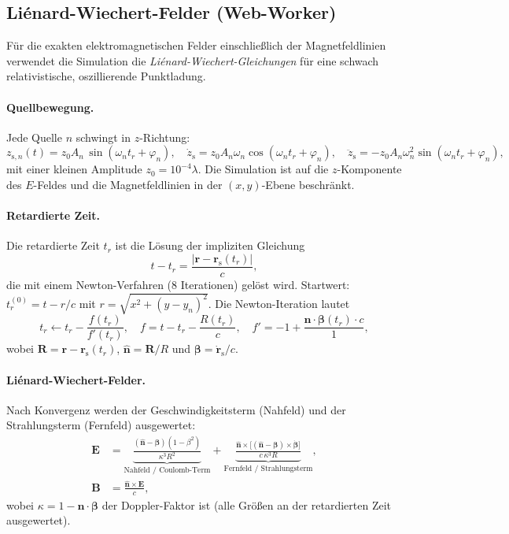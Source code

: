 \documentclass[11pt,a4paper]{article}
\begin{document}
\subsection{Liénard-Wiechert-Felder (Web-Worker)}

Für die exakten elektromagnetischen Felder einschließlich der Magnetfeldlinien
verwendet die Simulation die \emph{Liénard-Wiechert-Gleichungen} für eine
schwach relativistische, oszillierende Punktladung.

\paragraph{Quellbewegung.}
Jede Quelle $n$ schwingt in $z$-Richtung:
\[
  z_{\text{s},n}(t) = z_0 A_n\,\sin(\omega_n t_r + \varphi_n), \quad
  \dot z_{\text{s}} = z_0 A_n \omega_n \cos(\omega_n t_r + \varphi_n), \quad
  \ddot z_{\text{s}} = -z_0 A_n \omega_n^2 \sin(\omega_n t_r + \varphi_n),
\]
mit einer kleinen Amplitude $z_0 = 10^{-4}\lambda$.  Die Simulation ist auf die
$z$-Komponente des $E$-Feldes und die Magnetfeldlinien in der $(x,y)$-Ebene
beschränkt.

\paragraph{Retardierte Zeit.}
Die retardierte Zeit $t_r$ ist die Lösung der impliziten Gleichung
\[
  t - t_r = \frac{|\mathbf{r} - \mathbf{r}_{\text{s}}(t_r)|}{c},
\]
die mit einem Newton-Verfahren (8 Iterationen) gelöst wird.
Startwert: $t_r^{(0)} = t - r/c$ mit $r = \sqrt{x^2 + (y-y_n)^2}$.
Die Newton-Iteration lautet
\[
  t_r \leftarrow t_r - \frac{f(t_r)}{f'(t_r)}, \quad
  f = t - t_r - \frac{R(t_r)}{c}, \quad
  f' = -1 + \frac{\hat{\mathbf{n}}\cdot\boldsymbol{\beta}(t_r) \cdot c}{1},
\]
wobei $\mathbf{R} = \mathbf{r} - \mathbf{r}_{\text{s}}(t_r)$,
$\hat{\mathbf{n}} = \mathbf{R}/R$ und
$\boldsymbol{\beta} = \dot{\mathbf{r}}_{\text{s}}/c$.

\paragraph{Liénard-Wiechert-Felder.}
Nach Konvergenz werden der Geschwindigkeitsterm (Nahfeld) und der
Strahlungsterm (Fernfeld) ausgewertet:
\begin{align}
  \mathbf{E} &= \underbrace{\frac{(\hat{\mathbf{n}} - \boldsymbol{\beta})(1-\beta^2)}
                              {\kappa^3 R^2}}_{\text{Nahfeld / Coulomb-Term}}
             + \underbrace{\frac{\hat{\mathbf{n}}\times\bigl[(\hat{\mathbf{n}}-\boldsymbol{\beta})\times\dot{\boldsymbol{\beta}}\bigr]}
                              {c\,\kappa^3 R}}_{\text{Fernfeld / Strahlungsterm}},
  \\[6pt]
  \mathbf{B} &= \frac{\hat{\mathbf{n}}\times\mathbf{E}}{c},
\end{align}
wobei $\kappa = 1 - \hat{\mathbf{n}}\cdot\boldsymbol{\beta}$ der
Doppler-Faktor ist (alle Größen an der retardierten Zeit ausgewertet).
\end{document}
